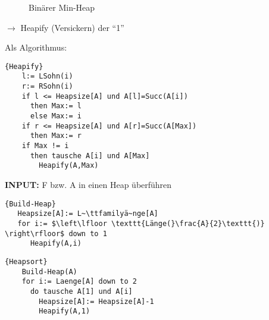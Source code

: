 \documentclass[ngerman,draft,parskip=half*,twoside]{scrreprt}
\theoremstyle{break}
\begin{document}
\begin{figure}[H]
	\centering\hspace{6mm}\hspace{6mm}
	\caption{Binärer Min-Heap}
	\label{101103f}
\end{figure}
$\rightarrow$ Heapify (Versickern) der "`1"' 

Als Algorithmus:
  \begin{Algorithmus}[ht]
  \begin{lstlisting}[frame=tlrb, mathescape=true, title=\textsc{Heapify\textnormal{(A)}}, gobble=4]{Heapify}
    l:= LSohn(i)
    r:= RSohn(i)
    if l <= Heapsize[A] und A[l]=Succ(A[i])
      then Max:= l
      else Max:= i
    if r <= Heapsize[A] und A[r]=Succ(A[Max])
      then Max:= r
    if Max != i
      then tausche A[i] und A[Max]
        Heapify(A,Max) 
    \end{lstlisting}
  \end{Algorithmus}

\textbf{INPUT:} F bzw. A in einen Heap überführen
\begin{Algorithmus}[ht]
\begin{lstlisting}[frame=tlrb, mathescape=true, title=\textsc{Build-Heap\textnormal{(A)}}, gobble=2]{Build-Heap}  
   Heapsize[A]:= L~\ttfamilyä~nge[A]
   for i:= $\left\lfloor \texttt{Länge(}\frac{A}{2}\texttt{)} \right\rfloor$ down to 1
      Heapify(A,i)
    \end{lstlisting}
  \end{Algorithmus}

  \begin{Algorithmus}[ht]
\begin{lstlisting}[frame=tlrb, mathescape=true, title=\textsc{Heapsort\textnormal{(A)}}, gobble=4]{Heapsort}
    Build-Heap(A)
    for i:= Laenge[A] down to 2
      do tausche A[1] und A[i]
        Heapsize[A]:= Heapsize[A]-1
        Heapify(A,1)
    \end{lstlisting}
  \end{Algorithmus}
  
\end{document}
